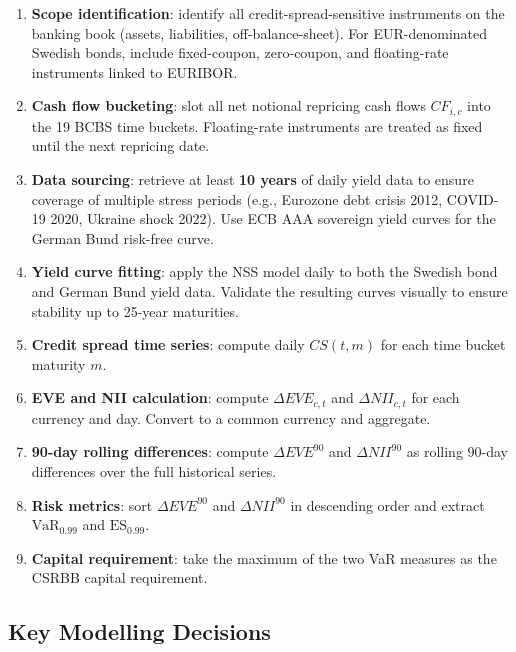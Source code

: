 \documentclass[11pt, a4paper]{article}
\begin{document}
\begin{enumerate}
    \item \textbf{Scope identification}: identify all credit-spread-sensitive instruments on the banking book (assets, liabilities, off-balance-sheet). For EUR-denominated Swedish bonds, include fixed-coupon, zero-coupon, and floating-rate instruments linked to EURIBOR.

    \item \textbf{Cash flow bucketing}: slot all net notional repricing cash flows $CF_{i,c}$ into the 19 BCBS time buckets. Floating-rate instruments are treated as fixed until the next repricing date.

    \item \textbf{Data sourcing}: retrieve at least \textbf{10 years} of daily yield data to ensure coverage of multiple stress periods (e.g., Eurozone debt crisis 2012, COVID-19 2020, Ukraine shock 2022). Use ECB AAA sovereign yield curves for the German Bund risk-free curve.

    \item \textbf{Yield curve fitting}: apply the NSS model daily to both the Swedish bond and German Bund yield data. Validate the resulting curves visually to ensure stability up to 25-year maturities.

    \item \textbf{Credit spread time series}: compute daily $CS(t, m)$ for each time bucket maturity $m$.

    \item \textbf{EVE and NII calculation}: compute $\Delta EVE_{c,t}$ and $\Delta NII_{c,t}$ for each currency and day. Convert to a common currency and aggregate.

    \item \textbf{90-day rolling differences}: compute $\Delta EVE^{90}$ and $\Delta NII^{90}$ as rolling 90-day differences over the full historical series.

    \item \textbf{Risk metrics}: sort $\Delta EVE^{90}$ and $\Delta NII^{90}$ in descending order and extract $\mathrm{VaR}_{0.99}$ and $\mathrm{ES}_{0.99}$.

    \item \textbf{Capital requirement}: take the maximum of the two VaR measures as the CSRBB capital requirement.
\end{enumerate}

\subsection{Key Modelling Decisions}
\end{document}
